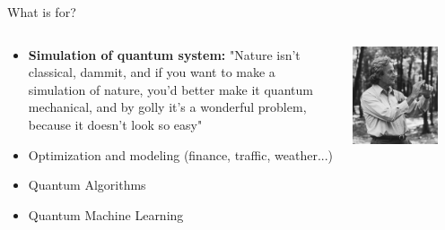 \documentclass[aspectratio=169,10pt]{beamer}
\begin{document}
\begin{frame}{What is for?}
  \begin{columns}
    \begin{column}{0.5\textwidth}
      \begin{itemize}
        \item \textbf{Simulation of quantum system:} "Nature isn't classical, dammit, and if you want to make a simulation of nature, you'd better make it quantum mechanical, and by golly it's a wonderful problem, because it doesn't look so easy"
        \item Optimization and modeling (finance, traffic, weather...)
        \item Quantum Algorithms 
        \item Quantum Machine Learning
      \end{itemize}        
      \end{column}
      \begin{column}{0.5\textwidth}
        \begin{center}
            \includegraphics[width=0.8\textwidth]{figures/feynmann.jpg}
        \end{center}
      \end{column}
  \end{columns}
\end{frame}
\end{document}
